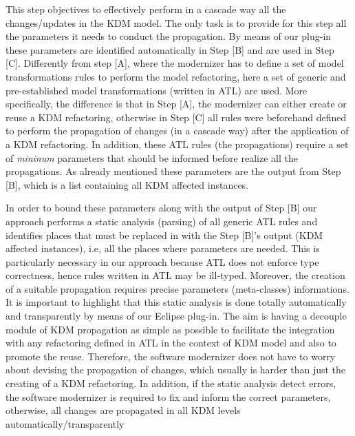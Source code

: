 This step objectives to effectively perform in a cascade way all the changes/updates in the KDM model. 
%
The only task is to provide for this step all the parameters it needs to conduct the propagation. By means of our plug-in these parameters are identified automatically in Step [B] and are used in Step [C]. 
%
%
Differently from step [A], where the modernizer has to define a set of model transformations rules to perform the model refactoring, here a set of generic and pre-established model transformations (written in ATL) are used. More specifically, the difference is that in Step [A], the modernizer can either create or reuse a KDM refactoring, otherwise in Step [C] all rules were beforehand defined to perform the propagation of changes (in a cascade way) after the application of a KDM refactoring. In addition, these ATL rules (the propagations) require a set of  \textit{mininum} parameters that should be informed before realize all the propagations. As already mentioned these parameters are the output from Step [B], which is a list containing all KDM affected instances. 

In order to bound these parameters along with the output of Step [B] our approach performs a static analysis (parsing) of all generic ATL rules and identifies places that must be replaced in with the Step [B]'s output (KDM affected instances), i.e, all the places where parameters are needed. This is particularly necessary in our approach because ATL does not enforce type correctness, hence rules written in ATL may be ill-typed. Moreover, the creation of a suitable propagation %
requires precise parameters (meta-classes) informations. It is important to highlight that this static analysis is done totally automatically and transparently by means of our Eclipse plug-in. The aim is having a decouple module of KDM propagation as simple as possible to facilitate the integration with any refactoring defined in ATL in the context of KDM model and also to promote the reuse. Therefore, the software modernizer does not have to worry about devising the propagation of changes, which usually is harder than just the creating of a KDM refactoring. 
%
In addition, if the static analysis detect errors, the software modernizer is required to fix and inform the correct parameters, otherwise, all changes are propagated in all KDM levels automatically/transparently  


